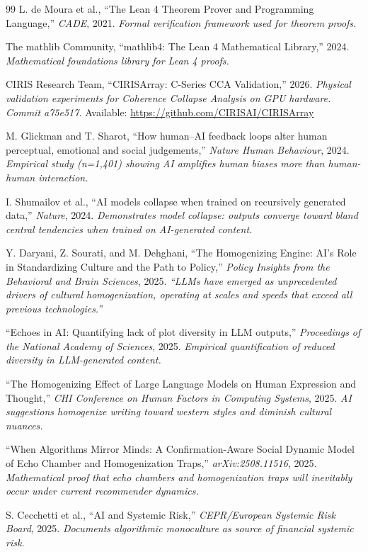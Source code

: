 \documentclass[11pt,a4paper]{article}
\theoremstyle{definition}
\theoremstyle{remark}
\begin{document}
\begin{thebibliography}{99}
L. de Moura et al., ``The Lean 4 Theorem Prover and Programming Language,'' \textit{CADE}, 2021.
\textit{Formal verification framework used for theorem proofs.}

The mathlib Community, ``mathlib4: The Lean 4 Mathematical Library,'' 2024.
\textit{Mathematical foundations library for Lean 4 proofs.}

CIRIS Research Team, ``CIRISArray: C-Series CCA Validation,'' 2026.
\textit{Physical validation experiments for Coherence Collapse Analysis on GPU hardware. Commit a75e517.}
Available: \url{https://github.com/CIRISAI/CIRISArray}

M. Glickman and T. Sharot, ``How human--AI feedback loops alter human perceptual, emotional and social judgements,'' \textit{Nature Human Behaviour}, 2024.
\textit{Empirical study (n=1,401) showing AI amplifies human biases more than human-human interaction.}

I. Shumailov et al., ``AI models collapse when trained on recursively generated data,'' \textit{Nature}, 2024.
\textit{Demonstrates model collapse: outputs converge toward bland central tendencies when trained on AI-generated content.}

Y. Daryani, Z. Sourati, and M. Dehghani, ``The Homogenizing Engine: AI's Role in Standardizing Culture and the Path to Policy,'' \textit{Policy Insights from the Behavioral and Brain Sciences}, 2025.
\textit{``LLMs have emerged as unprecedented drivers of cultural homogenization, operating at scales and speeds that exceed all previous technologies.''}

``Echoes in AI: Quantifying lack of plot diversity in LLM outputs,'' \textit{Proceedings of the National Academy of Sciences}, 2025.
\textit{Empirical quantification of reduced diversity in LLM-generated content.}

``The Homogenizing Effect of Large Language Models on Human Expression and Thought,'' \textit{CHI Conference on Human Factors in Computing Systems}, 2025.
\textit{AI suggestions homogenize writing toward western styles and diminish cultural nuances.}

``When Algorithms Mirror Minds: A Confirmation-Aware Social Dynamic Model of Echo Chamber and Homogenization Traps,'' \textit{arXiv:2508.11516}, 2025.
\textit{Mathematical proof that echo chambers and homogenization traps will inevitably occur under current recommender dynamics.}

S. Cecchetti et al., ``AI and Systemic Risk,'' \textit{CEPR/European Systemic Risk Board}, 2025.
\textit{Documents algorithmic monoculture as source of financial systemic risk.}

\end{thebibliography}
\end{document}
